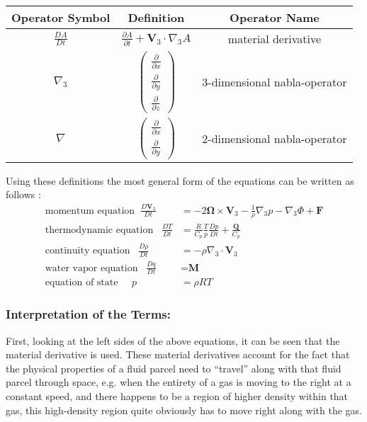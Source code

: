 {\tabulinesep=0.5mm
\begin{center}
\begin{tabu}{c|c|c} 
\hline
Operator Symbol & Definition & Operator Name \\ 
\hline 
$\frac{DA}{Dt}$ & $\frac{\partial A}{\partial t}+\textbf{V}_3\cdot \nabla_3A$ & material derivative \\ 
\hline 
$\nabla _3$ & $\begin{pmatrix}
\frac{\partial }{\partial x} \\ 
\frac{\partial }{\partial y} \\ 
\frac{\partial }{\partial z}
\end{pmatrix}$ & 3-dimensional nabla-operator \\
\hline 
$\nabla$ & $\begin{pmatrix}
\frac{\partial }{\partial x} \\ 
\frac{\partial }{\partial y}
\end{pmatrix}$ & 2-dimensional nabla-operator
\end{tabu}
\end{center}}


Using these definitions the most general form of the equations can be written as follows \cite{coiffier2011fundamentals}:
\begin{align}
\text{momentum equation}\;\; \frac{D\textbf{V}_3}{Dt} &= -2\boldsymbol{\Omega}\times \textbf{V}_3 - \frac{1}{\rho}\nabla _3 p - \nabla _3 \Phi + \textbf{F} \label{eq_mom}\\
\text{thermodynamic equation}\;\;\; \frac{DT}{Dt} &= \frac{R}{C_p}\frac{T}{p}\frac{Dp}{Dt}+\frac{\textbf{Q}}{C_p}\label{eq_therm}\\
\text{continuity equation}\;\;\; \frac{D\rho}{Dt} &= -\rho \nabla _3 \cdot \textbf{V}_3\label{eq_cont}\\
\text{water vapor equation}\;\;\; \frac{Dq}{Dt} &= \textbf{M}\label{eq_water}\\
\text{equation of state}\;\;\;\;\; p &= \rho R T \label{eq_state}
\end{align}
\subsubsection{Interpretation of the Terms:}
First, looking at the left sides of the above equations, it can be seen that the material derivative is used.
These material derivatives account for the fact that the physical properties of a fluid parcel need to ``travel'' along with that fluid parcel through space, e.g. when the entirety of a gas is moving to the right at a constant speed, and there happens to be a region of higher density within that gas, this high-density region quite obviously has to move right along with the gas.

